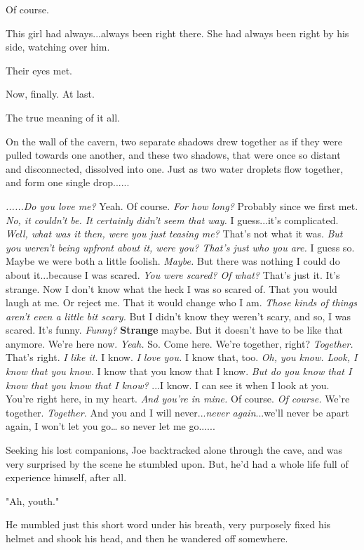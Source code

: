 \documentclass[
]{article}
\begin{document}
Of course.

This girl had always...always been right there. She had always been
right by his side, watching over him.

Their eyes met.

Now, finally. At last.

The true meaning of it all.

On the wall of the cavern, two separate shadows drew together as if they
were pulled towards one another, and these two shadows, that were once
so distant and disconnected, dissolved into one. Just as two water
droplets flow together, and form one single drop......

\emph{......Do you love me? }Yeah. Of course. \emph{For how long?}
Probably since we first met. \emph{No, it couldn't be. It certainly
didn't seem that way.} I guess...it's complicated. \emph{Well, what was
it then, were you just teasing me?} That's not what it was. \emph{But
you weren't being upfront about it, were you? That's just who you are.}
I guess so. Maybe we were both a little foolish. \emph{Maybe.} But there
was nothing I could do about it...because I was scared. \emph{You were
scared? Of what?} That's just it. It's strange. Now I don't know what
the heck I was so scared of. That you would laugh at me. Or reject me.
That it would change who I am. \emph{Those kinds of things aren't even a
little bit scary.} But I didn't know they weren't scary, and so, I was
scared. It's funny. \emph{Funny?} \textbf{Strange} maybe. But it doesn't
have to be like that anymore. We're here now. \emph{Yeah.} So. Come
here. We're together, right? \emph{Together.} That's right. \emph{I like
it.} I know. \emph{I love you. }I know that, too. \emph{Oh, you know.
Look, I know that you know. }I know that you know that I know. \emph{But
do you know that I know that you know that I know?} ...I know. I can see
it when I look at you. You're right here, in my heart. \emph{And you're
in mine.} Of course. \emph{Of course.} We're together. \emph{Together.}
And you and I will never...\emph{never again}...we'll never be apart
again, I won't let you go\ldots{} so never let me go......

Seeking his lost companions, Joe backtracked alone through the cave, and
was very surprised by the scene he stumbled upon. But, he'd had a whole
life full of experience himself, after all.

"Ah, youth."

He mumbled just this short word under his breath, very purposely fixed
his helmet and shook his head, and then he wandered off somewhere.
\end{document}
